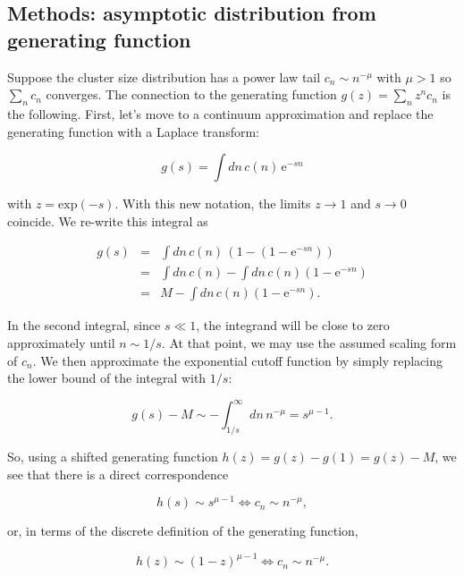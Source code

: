 \documentclass[12pt]{article}
\def\be{\begin{equation}}
\def\ee{\end{equation}}
\def\bea{\begin{eqnarray}}
\def\eea{\end{eqnarray}}
\def\exp{\text{exp}}
\def\e{\text{e}}
\begin{document}
\subsection*{Methods: asymptotic distribution from generating function}

Suppose the cluster size distribution has a power law tail $c_n \sim n^{-\mu}$ with $\mu > 1$ so $\sum_n c_n$ converges. The connection to the generating function $g(z) = \sum_n z^n c_n$ is the following. First, let's move to a continuum approximation and replace the generating function with a Laplace transform:

\be
g(s) = \int dn\, c(n)\,  \e^{-sn} 
\ee

\noindent with $z = \exp(-s)$. With this new notation, the limits $z \to 1$ and $s \to 0$ coincide. We re-write this integral as 

\bea
g(s) 	&=& \int dn \, c(n) \, \left(1-\left(1-\e^{-sn}\right)\right)\nonumber\\
		&=& \int dn \, c(n) - \int dn \, c(n)\left(1-\e^{-sn}\right)\nonumber\\
		&=& M - \int dn \, c(n)\left(1-\e^{-sn}\right).
\eea

\noindent In the second integral, since $s \ll 1$, the integrand will be close to zero approximately until $n\sim 1/s$. At that point, we may use the assumed scaling form of $c_n$. We then approximate the exponential cutoff function by simply replacing the lower bound of the integral with $1/s$:

\be
g(s) - M \sim -\int_{1/s}^{\infty} dn \, n^{-\mu} = s^{\mu-1}.
\ee

So, using a shifted generating function $h(z) = g(z) - g(1) = g(z) - M$, we see that there is a direct correspondence

\be
h(s) \sim s^{\mu-1} \Longleftrightarrow c_n \sim n^{-\mu},
\ee

\noindent or, in terms of the discrete definition of the generating function,

\be
h(z) \sim (1-z)^{\mu-1} \Longleftrightarrow c_n \sim n^{-\mu}.
\ee
\end{document}
